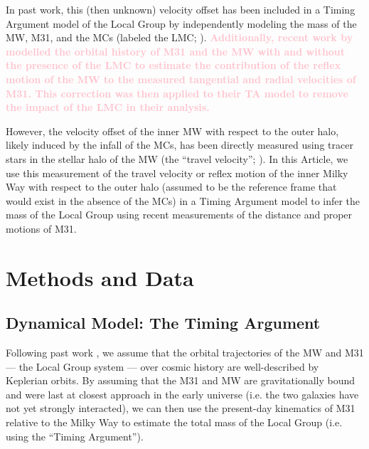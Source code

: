 \documentclass[twocolumn]{aastex631}
\newcommand{\kc}[1]{\textcolor{pink}{\textbf{#1}} }
\begin{document}
In past work, this (then unknown) velocity offset has been included in a Timing
Argument model of the Local Group by independently modeling the mass of the MW,
M31, and the MCs (labeled the LMC; \citealt{Penarrubia2016}). 
\kc{Additionally, recent work by \cite{Benisty2022} modelled the orbital history
of M31 and the MW with and without the presence of the LMC to estimate the 
contribution of 
the reflex motion of the MW to the measured tangential and radial velocities of 
M31. This correction was then applied to their TA model to remove the impact of 
the LMC in their analysis.}


However, the velocity offset of the inner MW with respect to the outer halo,
likely induced by the infall of the MCs, has been directly measured using tracer
stars in the stellar halo of the MW (the ``travel velocity'';
\citealt{Petersen2021}).
In this Article, we use this measurement of the travel velocity or reflex motion
of the inner Milky Way with respect to the outer halo (assumed to be the
reference frame that would exist in the absence of the MCs) in a Timing Argument
model to infer the mass of the Local Group using recent measurements of the
distance and proper motions of M31.



\section{Methods and Data}

\subsection{Dynamical Model: The Timing Argument}
\label{sec:timingarg}

Following past work \citep[e.g.,][]{Lynden-Bell:1981, vdm2012, Penarrubia2016},
we assume that the orbital trajectories of the MW and M31 --- the Local Group
system --- over cosmic history are well-described by Keplerian orbits.
By assuming that the M31 and MW are gravitationally bound and were last at
closest approach in the early universe (i.e. the two galaxies have not yet
strongly interacted), we can then use the present-day kinematics of M31 relative
to the Milky Way to estimate the total mass of the Local Group (i.e. using the
``Timing Argument'').
\end{document}
